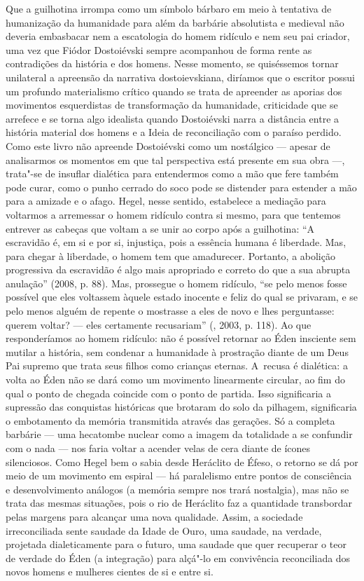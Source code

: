 Que a guilhotina irrompa como um símbolo bárbaro em meio à tentativa de
humanização da humanidade para além da barbárie absolutista e medieval
não deveria embasbacar nem a escatologia do homem ridículo e nem seu pai
criador, uma vez que Fiódor Dostoiévski sempre acompanhou de forma rente
as contradições da história e dos homens. Nesse momento, se quiséssemos
tornar unilateral a apreensão da narrativa dostoievskiana, diríamos que
o escritor possui um profundo materialismo crítico quando se trata de
apreender as aporias dos movimentos esquerdistas de transformação da
humanidade, criticidade que se arrefece e se torna algo idealista quando
Dostoiévski narra a distância entre a história material dos homens e a
Ideia de reconciliação com o paraíso perdido. Como este livro não
apreende Dostoiévski como um nostálgico --- apesar de analisarmos os
momentos em que tal perspectiva está presente em sua obra ---, trata"-se
de insuflar dialética para entendermos como a mão que fere também pode
curar, como o punho cerrado do soco pode se distender para estender a
mão para a amizade e o afago. Hegel, nesse sentido, estabelece a
mediação para voltarmos a arremessar o homem ridículo contra si mesmo,
para que tentemos entrever as cabeças que voltam a se unir ao corpo após
a guilhotina: ``A escravidão é, em si e por si, injustiça, pois a
essência humana é liberdade. Mas, para chegar à liberdade, o homem tem
que amadurecer. Portanto, a abolição progressiva da escravidão é algo
mais apropriado e correto do que a sua abrupta anulação'' (2008, p. 88).
Mas, prossegue o homem ridículo, ``se pelo menos fosse possível que eles
voltassem àquele estado inocente e feliz do qual se privaram, e se pelo
menos alguém de repente o mostrasse a eles de novo e lhes perguntasse:
querem voltar? --- eles certamente recusariam'' (, 2003, p.
118). Ao que responderíamos ao homem ridículo: não é possível retornar
ao Éden insciente sem mutilar a história, sem condenar a humanidade à
prostração diante de um Deus Pai supremo que trata seus filhos como
crianças eternas. A~recusa é dialética: a volta ao Éden não se dará como
um movimento linearmente circular, ao fim do qual o ponto de chegada
coincide com o ponto de partida. Isso significaria a supressão das
conquistas históricas que brotaram do solo da pilhagem, significaria o
embotamento da memória transmitida através das gerações. Só a completa
barbárie --- uma hecatombe nuclear como a imagem da totalidade a se
confundir com o nada --- nos faria voltar a acender velas de cera diante
de ícones silenciosos. Como Hegel bem o sabia desde Heráclito de Éfeso,
o retorno se dá por meio de um movimento em espiral --- há paralelismo
entre pontos de consciência e desenvolvimento análogos (a memória sempre
nos trará nostalgia), mas não se trata das mesmas situações, pois o rio
de Heráclito faz a quantidade transbordar pelas margens para alcançar
uma nova qualidade. Assim, a sociedade irreconciliada sente saudade da
Idade de Ouro, uma saudade, na verdade, projetada dialeticamente para o
futuro, uma saudade que quer recuperar o teor de verdade do Éden (a
integração) para alçá"-lo em convivência reconciliada dos novos homens e
mulheres cientes de si e entre si.

